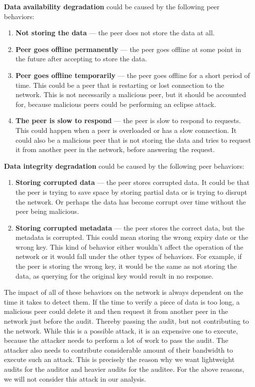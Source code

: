 \textbf{Data availability degradation} could be caused by the following peer behaviors:
\begin{enumerate}
    \item \textbf{Not storing the data} --- the peer does not store the data at all.
    \item \textbf{Peer goes offline permanently} --- the peer goes offline at some point in the future after accepting to store the data.
    \item \textbf{Peer goes offline temporarily} --- the peer goes offline for a short period of time.
        This could be a peer that is restarting or lost connection to the network.
        This is not necessarily a malicious peer, but it should be accounted for,
        because malicious peers could be performing an eclipse attack.
    \item \textbf{The peer is slow to respond} --- the peer is slow to respond to requests.
        This could happen when a peer is overloaded or has a slow connection.
        It could also be a malicious peer that is not storing the data and tries to request it
        from another peer in the network, before answering the request.
\end{enumerate}

\textbf{Data integrity degradation} could be caused by the following peer behaviors:
\begin{enumerate}
    \item \textbf{Storing corrupted data} --- the peer stores corrupted data.
        It could be that the peer is trying to save space by storing partial data
        or is trying to disrupt the network.
        Or perhaps the data has become corrupt over time without the peer being malicious.
    \item \textbf{Storing corrupted metadata} --- the peer stores the correct data, but the metadata is corrupted.
        This could mean storing the wrong expiry date or the wrong key.
        This kind of behavior either wouldn't affect the operation of the network or it would fall
        under the other types of behaviors.
        For example, if the peer is storing the wrong key, it would be the same as not storing the data,
        as querying for the original key would result in no response.
\end{enumerate}

The impact of all of these behaviors on the network is always dependent on the time it takes to detect them.
If the time to verify a piece of data is too long, a malicious peer could delete it and then
request it from another peer in the network just before the audit.
Thereby passing the audit, but not contributing to the network.
While this is a possible attack, it is an expensive one to execute,
because the attacker needs to perform a lot of work to pass the audit.
The attacker also needs to contribute considerable amount of their bandwidth to execute such an attack.
This is precisely the reason why we want lightweight audits for the auditor and heavier audits for the auditee.
For the above reasons, we will not consider this attack in our analysis.

